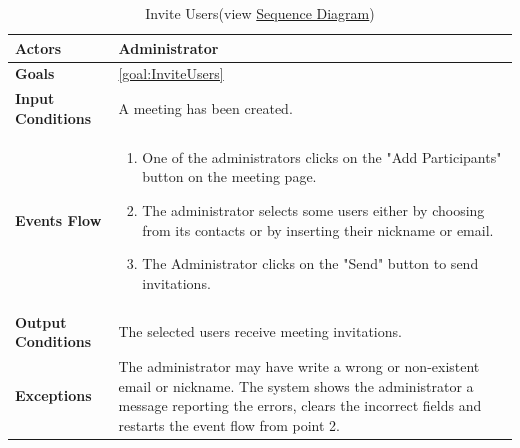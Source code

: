 \begin{table}[H]
	\centering
	\def\arraystretch{1.5}
	\begin{tabular}{|m{7cm}|m{7cm}|}
		\hline
		\textbf{Actors}            & Administrator    \\ \hline
		\textbf{Goals}             & \ref{goal:InviteUsers}           \\ \hline
		\textbf{Input Conditions}  & A meeting has been created.           \\ \hline
		\textbf{Events Flow}       &  
		\begin{enumerate}[topsep=0pt, leftmargin=*]
			\item One of the administrators clicks on the "Add Participants" button on the meeting page.
			\item The administrator selects some users either by choosing from its contacts or by inserting their nickname or email.
			\item The Administrator clicks on the "Send" button to send invitations.
		\end{enumerate}           \\ \hline
		\textbf{Output Conditions} & The selected users receive meeting invitations.            \\ \hline
		\textbf{Exceptions}        & 
		The administrator may have write a wrong or non-existent email or nickname. The system shows the administrator a message reporting the errors, clears the incorrect fields and restarts the event flow from point 2.     \\ \hline
	\end{tabular}
	\caption[Invite Users]{{Invite Users}\label{UseCaseDescr:InviteUsers} (view \hyperref[SeqDiagr:InviteUsers]{Sequence Diagram})}
\end{table}

